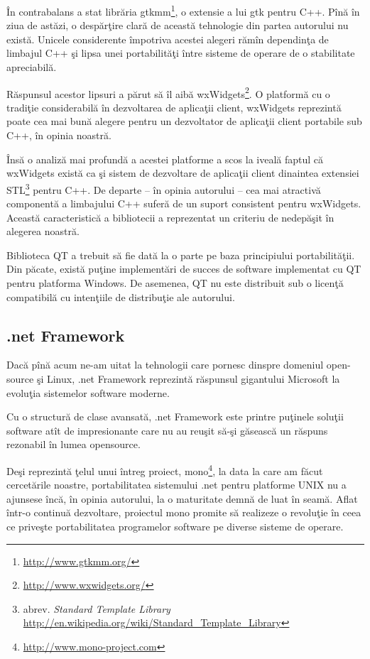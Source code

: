 În contrabalans a stat librăria gtkmm\footnote{\url{http://www.gtkmm.org/}}, o 
extensie a lui gtk pentru C++. Pînă în ziua de astăzi, o despărţire clară de 
această tehnologie din partea autorului nu există. Unicele considerente 
împotriva acestei alegeri rămîn dependinţa de limbajul C++ şi lipsa unei 
portabilităţi între sisteme de operare de o stabilitate apreciabilă.

Răspunsul acestor lipsuri a părut să îl aibă 
wxWidgets\footnote{\url{http://www.wxwidgets.org/}}. O platformă cu o tradiţie 
considerabilă în dezvoltarea de aplicaţii client, wxWidgets reprezintă poate 
cea mai bună alegere pentru un dezvoltator de aplicaţii client portabile sub 
C++, în opinia noastră.

Însă o analiză mai profundă a acestei platforme a scos la iveală faptul că 
wxWidgets există ca şi sistem de dezvoltare de aplicaţii client dinaintea 
extensiei STL\footnote{abrev. \textit{Standard Template Library} 
\url{http://en.wikipedia.org/wiki/Standard_Template_Library}} pentru C++. De 
departe -- în opinia autorului -- cea mai atractivă componentă a limbajului C++ 
suferă de un suport consistent pentru wxWidgets.\cite{wxfaq} Această 
caracteristică a bibliotecii a reprezentat un criteriu de nedepăşit în alegerea 
noastră.

Biblioteca QT a trebuit să fie dată la o parte pe baza principiului 
portabilităţii. Din păcate, există puţine implementări de succes de software 
implementat cu QT pentru platforma Windows. De asemenea, QT nu este distribuit 
sub o licenţă compatibilă cu intenţiile de distribuţie ale autorului.

\subsection{.net Framework}

Dacă pînă acum ne-am uitat la tehnologii care pornesc dinspre domeniul 
open-source şi Linux, .net Framework reprezintă răspunsul gigantului Microsoft 
la evoluţia sistemelor software moderne.

Cu o structură de clase avansată, .net Framework este printre puţinele soluţii 
software atît de impresionante care nu au reuşit să-şi găsească un răspuns 
rezonabil în lumea opensource.

Deşi reprezintă ţelul unui întreg proiect, 
mono\footnote{\url{http://www.mono-project.com}}, la data la care am făcut 
cercetările noastre, portabilitatea sistemului .net pentru platforme UNIX nu a 
ajunsese încă, în opinia autorului, la o maturitate demnă de luat în seamă. 
Aflat într-o continuă dezvoltare, proiectul mono promite să realizeze o 
revoluţie în ceea ce priveşte portabilitatea programelor software pe diverse 
sisteme de operare.

